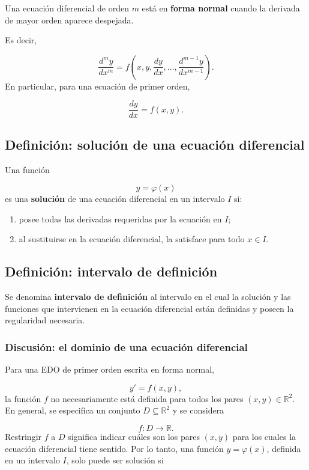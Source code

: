\documentclass[12pt,a4paper]{article}
\begin{document}
	Una ecuación diferencial de orden \(m\) está en \textbf{forma normal} cuando la derivada de mayor orden aparece despejada.
	
	Es decir,
	
	\[
	\frac{d^m y}{dx^m}
	=
	f\left(
	x,
	y,
	\frac{dy}{dx},
	\dots,
	\frac{d^{m-1}y}{dx^{m-1}}
	\right).
	\]
	En particular, para una ecuación de primer orden,
	
	\[
	\frac{dy}{dx}
	=
	f(x,y).
	\]
	\subsection{Definición: solución de una ecuación diferencial}
	
	Una función
	
	\[
	y=\varphi(x)
	\]
	es una \textbf{solución} de una ecuación diferencial en un intervalo \(I\) si:
	
	\begin{enumerate}[label=\arabic*.]
		\item posee todas las derivadas requeridas por la ecuación en \(I\);
		\item al sustituirse en la ecuación diferencial, la satisface para todo \(x\in I\).
	\end{enumerate}
	
	\subsection{Definición: intervalo de definición}
	
	Se denomina \textbf{intervalo de definición} al intervalo en el cual la solución y las funciones que intervienen en la ecuación diferencial están definidas y poseen la regularidad necesaria.
	
	\subsubsection*{Discusión: el dominio de una ecuación diferencial}
	
	Para una EDO de primer orden escrita en forma normal,
	
	\[
	y'=f(x,y),
	\]
	la función \(f\) no necesariamente está definida para todos los pares \((x,y)\in\mathbb{R}^2\). En general, se especifica un conjunto \(D\subseteq\mathbb{R}^2\) y se considera
	
	\[
	f\colon D\longrightarrow\mathbb{R}.
	\]
	Restringir \(f\) a \(D\) significa indicar cuáles son los pares \((x,y)\) para los cuales la ecuación diferencial tiene sentido. Por lo tanto, una función \(y=\varphi(x)\), definida en un intervalo \(I\), solo puede ser solución si
	
\end{document}
